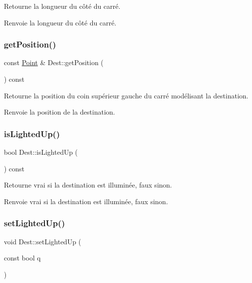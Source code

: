 Retourne la longueur du côté du carré. \begin{DoxyReturn}{Renvoie}
la longueur du côté du carré. 
\end{DoxyReturn}
\mbox{\label{class_dest_a0705b1cbab9df30ef1cef4807a324f98}} 
\subsubsection{\texorpdfstring{getPosition()}{getPosition()}}
{\footnotesize\ttfamily const \mbox{\hyperlink{class_point}{Point}} \& Dest\+::get\+Position (\begin{DoxyParamCaption}{ }\end{DoxyParamCaption}) const}

Retourne la position du coin supérieur gauche du carré modélisant la destination. \begin{DoxyReturn}{Renvoie}
la position de la destination. 
\end{DoxyReturn}
\mbox{\label{class_dest_afc770857ab9f3089cfea805fa6a74f20}} 
\subsubsection{\texorpdfstring{isLightedUp()}{isLightedUp()}}
{\footnotesize\ttfamily bool Dest\+::is\+Lighted\+Up (\begin{DoxyParamCaption}{ }\end{DoxyParamCaption}) const}

Retourne vrai si la destination est illuminée, faux sinon. \begin{DoxyReturn}{Renvoie}
vrai si la destination est illuminée, faux sinon. 
\end{DoxyReturn}
\mbox{\label{class_dest_ad18899d40086cc90594cce9f6e56468f}} 
\subsubsection{\texorpdfstring{setLightedUp()}{setLightedUp()}}
{\footnotesize\ttfamily void Dest\+::set\+Lighted\+Up (\begin{DoxyParamCaption}\item[{const bool}]{q }\end{DoxyParamCaption})}

